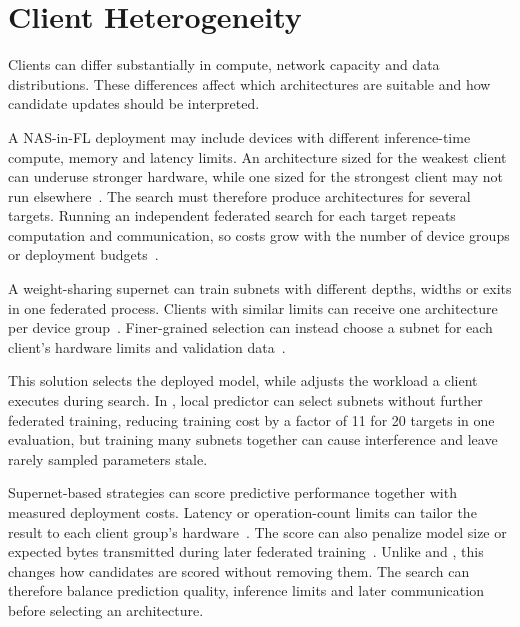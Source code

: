 \section{Client Heterogeneity}

Clients can differ substantially in compute, network capacity and data distributions. These differences affect which architectures are suitable and how candidate updates should be interpreted.


A NAS-in-FL deployment may include devices with different inference-time compute, memory and latency limits. An architecture sized for the weakest client can underuse stronger hardware, while one sized for the strongest client may not run elsewhere~\cite{fedoras_2022}. The search must therefore produce architectures for several targets. Running an independent federated search for each target repeats computation and communication, so costs grow with the number of device groups or deployment budgets~\cite{superfednas_2024}.

 A weight-sharing supernet can train subnets with different depths, widths or exits in one federated process. Clients with similar limits can receive one architecture per device group~\cite{fedoras_2022,clustered_direct_fednas_2022}. Finer-grained selection can instead choose a subnet for each client's hardware limits and validation data~\cite{superfednas_2024,hapfnas_2025,enasfl_2024}.

This solution selects the deployed model, while  adjusts the workload a client executes during search. In \cite{superfednas_2024}, local predictor can select subnets without further federated training, reducing training cost by a factor of 11 for 20 targets in one evaluation, but training many subnets together can cause interference and leave rarely sampled parameters stale.

 Supernet-based strategies can score predictive performance together with measured deployment costs. Latency or operation-count limits can tailor the result to each client group's hardware~\cite{clustered_direct_fednas_2022,load_monitoring_fednas_2025,fgfl_2024,privacy-preserving_nas_across_fl_iot_2021}. The score can also penalize model size or expected bytes transmitted during later federated training~\cite{multi_objective_evo_fl_2020,fedregnas_2025}. Unlike  and , this changes how candidates are scored without removing them. The search can therefore balance prediction quality, inference limits and later communication before selecting an architecture.


